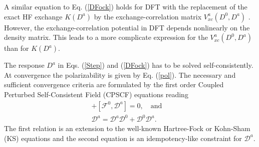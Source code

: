 \documentclass[twocolumn,showpacs,preprintnumbers,amsmath,amssymb]{revtex4}
\begin{document}

 A similar equation to Eq. (\ref{DFock}) 
 holds for DFT with the replacement of the exact HF
 exchange $K(D^a)$ by the exchange-correlation matrix 
 $V_{xc}^a(D^0,D^a)$ \cite{Lee_1994}. However,
 the exchange-correlation potential in DFT
 depends nonlinearly  on the density matrix. This leads
 to a more complicate expression for the
 $V_{xc}^a(D^0,D^a)$ than for $K(D^a)$.

 The response $D^a$ in Eqs. (\ref{Step}) and (\ref{DFock}) has
 to be solved self-consistently.
 At convergence the polarizability
 is given by Eq. (\ref{pol}). The necessary and
 sufficient convergence criteria are formulated by the first 
 order Coupled Perturbed Self-Consistent Field 
 (CPSCF) equations \cite{Furche_2001} reading
 \begin{gather}
   [\mathcal{F}^{a},\mathcal{D}^{0}]+
	       [\mathcal{F}^{0},\mathcal{D}^{a}]=0,\quad\textrm{and}\quad\\
   \mathcal{D}^{a}=\mathcal{D}^{a} \mathcal{D}^{0}
                     +\mathcal{D}^{0} \mathcal{D}^{a}.
 \end{gather}
 The first relation is an extension to the
 well-known Hartree-Fock or Kohn-Sham (KS) equations
 and the second equation is an idempotency-like
 constraint for $\mathcal{D}^a$.
\end{document}
